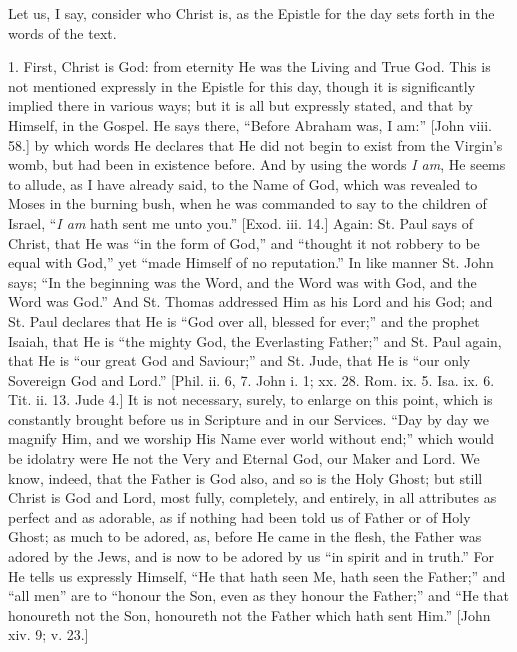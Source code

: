 Let us, I say, consider who Christ is, as the Epistle for the day
sets forth in the words of the text.

1. First, Christ is God: from eternity He was the Living and True
God. This is not mentioned expressly in the Epistle for this day, though
it is significantly implied there in various ways; but it is all but
expressly stated, and that by Himself, in the Gospel. He says there,
``Before Abraham was, I am:'' [John viii. 58.] by which words He
declares that He did not begin to exist from the Virgin's womb, but had
been in existence before. And by using the words \emph{I am}, He seems
to allude, as I have already said, to the Name of God, which was
revealed to Moses in the burning bush, when he was commanded to say to
the children of Israel, ``\emph{I am} hath sent me unto you.'' [Exod.
iii. 14.] Again: St. Paul says of Christ, that He was ``in the form
of God,'' and ``thought it not robbery to be equal with
God,'' yet ``made Himself of no reputation.'' In like manner
St. John says; ``In the beginning was the Word, and the Word was
with God, and the Word was God.'' And St. Thomas addressed Him as
his Lord and his God; and St. Paul declares that He is ``God over
all, blessed for ever;'' and the prophet Isaiah, that He is ``the
mighty God, the Everlasting Father;'' and St. Paul again, that He is
``our great God and Saviour;'' and St. Jude, that He is
``our only Sovereign God and Lord.'' [Phil. ii. 6, 7. John i. 1;
xx. 28. Rom. ix. 5. Isa. ix. 6. Tit. ii. 13. Jude 4.] It is not
necessary, surely, to enlarge on this point, which is constantly brought
before us in Scripture and in our Services. ``Day by day we magnify
Him, and we worship His Name ever world without end;'' which would
be idolatry were He not the Very and Eternal God, our Maker and Lord. We
know, indeed, that the Father is God also, and so is the Holy Ghost; but
still Christ is God and Lord, most fully, completely, and entirely, in
all attributes as perfect and as adorable, as if nothing had been told
us of Father or of Holy Ghost; as much to be adored, as, before He came
in the flesh, the Father was adored by the Jews, and is now to be adored
by us ``in spirit and in truth.'' For He tells us expressly
Himself, ``He that hath seen Me, hath seen the Father;'' and
``all men'' are to ``honour the Son, even as they honour the
Father;'' and ``He that honoureth not the Son, honoureth not the
Father which hath sent Him.'' [John xiv. 9; v. 23.]

